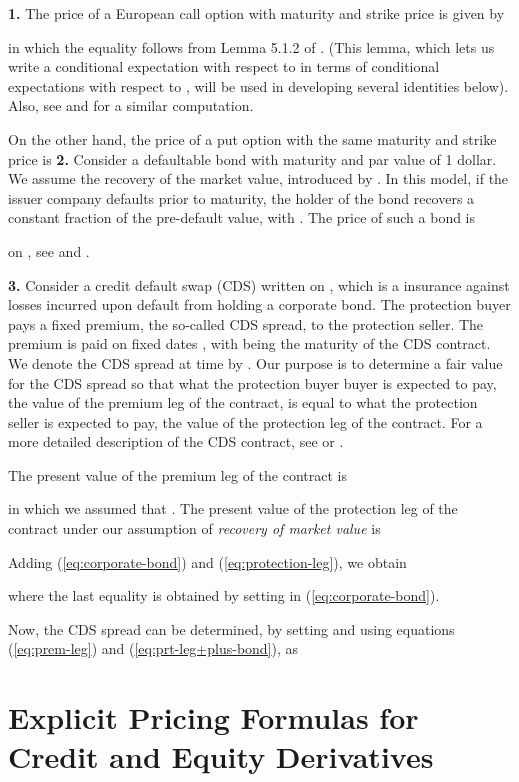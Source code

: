 \documentclass[11pt]{article}
\numberwithin{equation}{section}
\begin{document}
\textbf{1.} The price of a  European call option with maturity  and strike price  is given by

in which the equality follows from Lemma 5.1.2 of \cite{bielecki-rutkowski}. (This lemma, which lets us write a conditional expectation with respect to  in terms of conditional expectations with respect to , will be used in developing several identities below). Also, see \cite{Linetsky} and \cite{carr-linetsky} for a similar computation. 

On the other hand, the price of a put option with the same maturity and strike price is
{\small
}
\textbf{2.} Consider a defaultable bond with maturity  and par value of 1 dollar. We assume the recovery of the market value, introduced by \cite{duffie-singleton1999}. In this model, if the issuer company defaults prior to maturity, the holder of the bond recovers a constant fraction  of the pre-default value, with . The price of such a bond is

on , see \cite{duffie-singleton1999} and \cite{schonbucher1998}.

\textbf{3.} Consider a credit default swap (CDS) written on , which is a insurance against losses incurred upon default from holding a corporate bond.
The protection buyer pays a fixed premium, the so-called CDS spread, to the protection seller. The premium is paid on fixed dates 
, with
 being the maturity of the CDS contract. We denote the
CDS spread at time  by . Our purpose is to determine a fair value for the CDS spread so that what the protection buyer buyer is expected to pay, the value of the premium leg of the contract, is equal to what the protection seller is expected to pay, the value of the protection leg of the contract. For a more detailed description of the CDS contract, see \cite{bielecki-rutkowski} or \cite{schoenbucher}.


The present value of the premium leg of the contract is

in which we assumed that .
The present value of the protection leg of the contract under our
assumption of {\it recovery of market value} is


Adding (\ref{eq:corporate-bond}) and (\ref{eq:protection-leg}), we obtain

where the last equality is obtained by setting  in (\ref{eq:corporate-bond}).

Now, the CDS spread can be determined, by setting
 and using equations (\ref{eq:prem-leg}) and (\ref{eq:prt-leg+plus-bond}),
as


\section{Explicit Pricing Formulas for Credit and Equity Derivatives}
\end{document}
